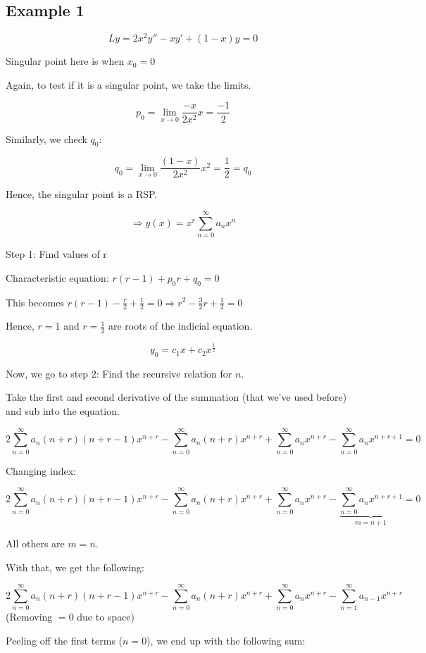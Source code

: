 \subsection{Example 1}

$$Ly = 2x^2 y'' - x y' + (1-x)y = 0$$

Singular point here is when $x_0 = 0$

Again, to test if it is a singular point, we take the limits. 

$$p_0 = \lim_{x \to 0} \frac{-x}{2x^2} x = \frac{-1}{2}$$

Similarly, we check $q_0$:

$$q_0 = \lim_{x \to 0} \frac{(1-x)}{2x^2} x^2 = \frac{1}{2} = q_0$$

Hence, the singular point is a RSP. 

$$\Rightarrow y(x) = x^r \sum_{n = 0}^\infty a_n x^n$$

Step 1: Find values of r

Characteristic equation: $r(r-1) + p_0 r + q_0 = 0$

This becomes $r(r-1) - \frac{r}{2} + \frac{1}{2} = 0 \Rightarrow r^2 - \frac{3}{2} r + \frac{1}{2} = 0$

Hence, $r = 1$ and $r = \frac{1}{2}$ are roots of the indicial equation. 

$$y_0 = c_1 x + c_2 x^{\frac{1}{2}}$$

Now, we go to step 2: Find the recursive relation for $n$. 

Take the first and second derivative of the summation (that we've used before) and sub into the equation. 

$$2\sum_{n = 0}^{\infty} a_n (n+r)(n+r-1) x^{n+r} - \sum_{n = 0}^{\infty} a_n (n+r) x^{n+r} + \sum_{n = 0}^\infty a_n x^{n+r} - \sum_{n = 0}^\infty a_n x^{n+r+1} = 0$$

Changing index:

$$2\sum_{n = 0}^{\infty} a_n (n+r)(n+r-1) x^{n+r} - \sum_{n = 0}^{\infty} a_n (n+r) x^{n+r} + \sum_{n = 0}^\infty a_n x^{n+r} - \underbrace{\sum_{n = 0}^\infty a_n x^{n+r+1}}_{m = n+1} = 0$$

All others are $m = n$. 

With that, we get the following:

$$2\sum_{n = 0}^{\infty} a_n (n+r)(n+r-1) x^{n+r} - \sum_{n = 0}^{\infty} a_n (n+r) x^{n+r} + \sum_{n = 0}^\infty a_n x^{n+r} - \sum_{n = 1}^\infty a_{n-1} x^{n+r}$$
(Removing $=0$ due to space)

Peeling off the first terms ($n=0$), we end up with the following sum:

